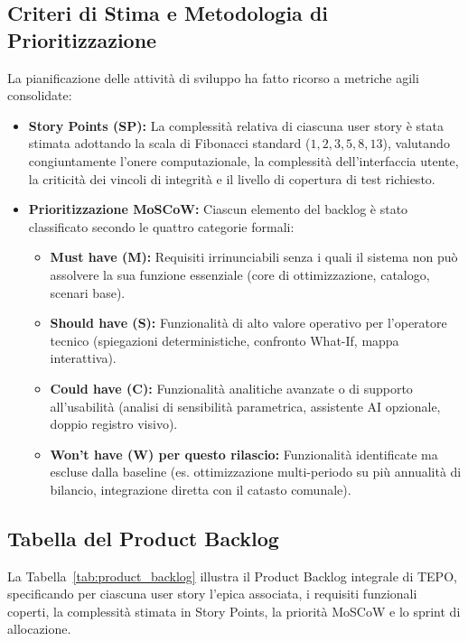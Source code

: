 \subsection{Criteri di Stima e Metodologia di Prioritizzazione}
La pianificazione delle attività di sviluppo ha fatto ricorso a metriche agili consolidate:
\begin{itemize}[leftmargin=1.5em, itemsep=0.3em]
    \item \textbf{Story Points (SP):} La complessità relativa di ciascuna user story è stata stimata adottando la scala di Fibonacci standard ($1, 2, 3, 5, 8, 13$), valutando congiuntamente l'onere computazionale, la complessità dell'interfaccia utente, la criticità dei vincoli di integrità e il livello di copertura di test richiesto.
    \item \textbf{Prioritizzazione MoSCoW:} Ciascun elemento del backlog è stato classificato secondo le quattro categorie formali:
    \begin{itemize}[leftmargin=1.2em, itemsep=0.15em]
        \item \textbf{Must have (M):} Requisiti irrinunciabili senza i quali il sistema non può assolvere la sua funzione essenziale (core di ottimizzazione, catalogo, scenari base).
        \item \textbf{Should have (S):} Funzionalità di alto valore operativo per l'operatore tecnico (spiegazioni deterministiche, confronto What-If, mappa interattiva).
        \item \textbf{Could have (C):} Funzionalità analitiche avanzate o di supporto all'usabilità (analisi di sensibilità parametrica, assistente AI opzionale, doppio registro visivo).
        \item \textbf{Won't have (W) per questo rilascio:} Funzionalità identificate ma escluse dalla baseline (es. ottimizzazione multi-periodo su più annualità di bilancio, integrazione diretta con il catasto comunale).
    \end{itemize}
\end{itemize}

\subsection{Tabella del Product Backlog}
La Tabella~\ref{tab:product_backlog} illustra il Product Backlog integrale di TEPO, specificando per ciascuna user story l'epica associata, i requisiti funzionali coperti, la complessità stimata in Story Points, la priorità MoSCoW e lo sprint di allocazione.


